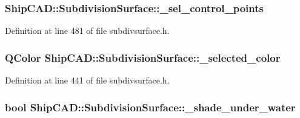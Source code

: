 \subsubsection[{\texorpdfstring{\+\_\+sel\+\_\+control\+\_\+points}{_sel_control_points}}]{ Ship\+C\+A\+D\+::\+Subdivision\+Surface\+::\+\_\+sel\+\_\+control\+\_\+points\hspace{0.3cm}{\ttfamily [protected]}}\hypertarget{classShipCAD_1_1SubdivisionSurface_a891ade2e87969ef453edcf712b1fe276}{}\label{classShipCAD_1_1SubdivisionSurface_a891ade2e87969ef453edcf712b1fe276}


Definition at line 481 of file subdivsurface.\+h.

\subsubsection[{\texorpdfstring{\+\_\+selected\+\_\+color}{_selected_color}}]{\setlength{\rightskip}{0pt plus 5cm}Q\+Color Ship\+C\+A\+D\+::\+Subdivision\+Surface\+::\+\_\+selected\+\_\+color\hspace{0.3cm}{\ttfamily [protected]}}\hypertarget{classShipCAD_1_1SubdivisionSurface_a3cfcbbe769216c753330f71e57a4cf4d}{}\label{classShipCAD_1_1SubdivisionSurface_a3cfcbbe769216c753330f71e57a4cf4d}


Definition at line 441 of file subdivsurface.\+h.

\subsubsection[{\texorpdfstring{\+\_\+shade\+\_\+under\+\_\+water}{_shade_under_water}}]{\setlength{\rightskip}{0pt plus 5cm}bool Ship\+C\+A\+D\+::\+Subdivision\+Surface\+::\+\_\+shade\+\_\+under\+\_\+water\hspace{0.3cm}{\ttfamily [protected]}}\hypertarget{classShipCAD_1_1SubdivisionSurface_ac3294d41679de31e588d603e3428565e}{}\label{classShipCAD_1_1SubdivisionSurface_ac3294d41679de31e588d603e3428565e}


